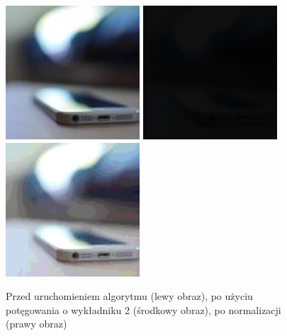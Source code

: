 \documentclass[a4paper,12pt]{book}
\begin{document}
\begin{figure}[H]
	\caption{Przed uruchomieniem algorytmu (lewy obraz), po użyciu potęgowania o wykładniku 2 (środkowy obraz), po normalizacji (prawy obraz)}
	\includegraphics[width=5cm, height=5cm]{phone-unmodified.jpg}
	\includegraphics[width=5cm, height=5cm]{3-6/root-color-phone-2.png}
	\includegraphics[width=5cm, height=5cm]{3-6/root-color-phone-2-norm.png}
\end{figure}
\end{document}
